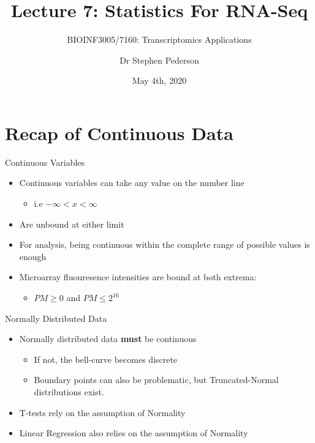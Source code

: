 \documentclass[aspectratio=169,11pt]{beamer}
\author{Dr Stephen Pederson}
\title{Lecture 7: Statistics For RNA-Seq}
\subtitle{BIOINF3005/7160: Transcriptomics Applications}
\institute{Bioinformatics Hub, \\The University of Adelaide}
\date{May 4th, 2020}
\begin{document}
\begin{frame}
\titlepage
\end{frame}

\begin{frame}
\footnotesize
\tableofcontents
\end{frame}

\section{Recap of Continuous Data}


\begin{frame}{Continuous Variables}

	\begin{itemize}
		\item Continuous variables can take any value on the number line
		\begin{itemize}
			\item i.e $-\infty < x < \infty$
		\end{itemize}		 
		\item Are unbound at either limit
		\item For analysis, being continuous within the complete range of possible values is enough
		\item Microarray fluouresence intensities are bound at both extrema:
		\begin{itemize}
			\item $PM \geq 0 $ and $PM \leq 2^{16}$
		\end{itemize}
	\end{itemize}

\end{frame}

\begin{frame}{Normally Distributed Data}

	\begin{itemize}
		\item Normally distributed data \textbf{must} be continuous
		\begin{itemize}
			\item If not, the bell-curve becomes discrete
			\item Boundary points can also be problematic, but Truncated-Normal distributions exist.		
		\end{itemize}
		\item T-tests rely on the assumption of Normality
		\item Linear Regression also relies on the assumption of Normality
	\end{itemize}

\end{frame}
\end{document}

